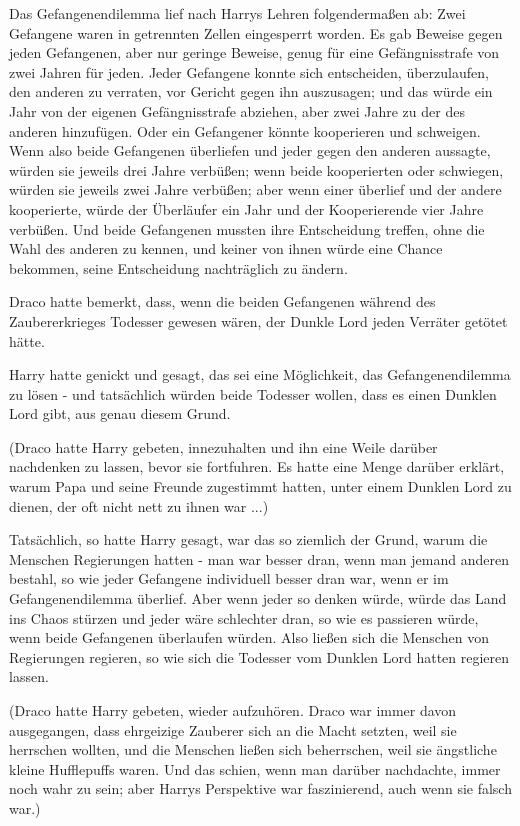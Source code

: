 Das Gefangenendilemma lief nach Harrys Lehren folgendermaßen ab: Zwei Gefangene
waren in getrennten Zellen eingesperrt worden. Es gab Beweise gegen jeden
Gefangenen, aber nur geringe Beweise, genug für eine Gefängnisstrafe von zwei
Jahren für jeden. Jeder Gefangene konnte sich entscheiden, überzulaufen, den
anderen zu verraten, vor Gericht gegen ihn auszusagen; und das würde ein Jahr
von der eigenen Gefängnisstrafe abziehen, aber zwei Jahre zu der des anderen
hinzufügen. Oder ein Gefangener könnte kooperieren und schweigen. Wenn also
beide Gefangenen überliefen und jeder gegen den anderen aussagte, würden sie
jeweils drei Jahre verbüßen; wenn beide kooperierten oder schwiegen, würden sie
jeweils zwei Jahre verbüßen; aber wenn einer überlief und der andere
kooperierte, würde der Überläufer ein Jahr und der Kooperierende vier Jahre
verbüßen. Und beide Gefangenen mussten ihre Entscheidung treffen, ohne die Wahl
des anderen zu kennen, und keiner von ihnen würde eine Chance bekommen, seine
Entscheidung nachträglich zu ändern.

Draco hatte bemerkt, dass, wenn die beiden Gefangenen während des
Zaubererkrieges Todesser gewesen wären, der Dunkle Lord jeden Verräter getötet
hätte.

Harry hatte genickt und gesagt, das sei eine Möglichkeit, das Gefangenendilemma
zu lösen - und tatsächlich würden beide Todesser wollen, dass es einen Dunklen
Lord gibt, aus genau diesem Grund.

(Draco hatte Harry gebeten, innezuhalten und ihn eine Weile darüber nachdenken
zu lassen, bevor sie fortfuhren. Es hatte eine Menge darüber erklärt, warum
Papa und seine Freunde zugestimmt hatten, unter einem Dunklen Lord zu dienen,
der oft nicht nett zu ihnen war ...)

Tatsächlich, so hatte Harry gesagt, war das so ziemlich der Grund, warum die
Menschen Regierungen hatten - man war besser dran, wenn man jemand anderen
bestahl, so wie jeder Gefangene individuell besser dran war, wenn er im
Gefangenendilemma überlief. Aber wenn jeder so denken würde, würde das Land ins
Chaos stürzen und jeder wäre schlechter dran, so wie es passieren würde, wenn
beide Gefangenen überlaufen würden. Also ließen sich die Menschen von
Regierungen regieren, so wie sich die Todesser vom Dunklen Lord hatten regieren
lassen.

(Draco hatte Harry gebeten, wieder aufzuhören. Draco war immer davon
ausgegangen, dass ehrgeizige Zauberer sich an die Macht setzten, weil sie
herrschen wollten, und die Menschen ließen sich beherrschen, weil sie ängstliche
kleine Hufflepuffs waren. Und das schien, wenn man darüber nachdachte, immer
noch wahr zu sein; aber Harrys Perspektive war faszinierend, auch wenn sie
falsch war.)

